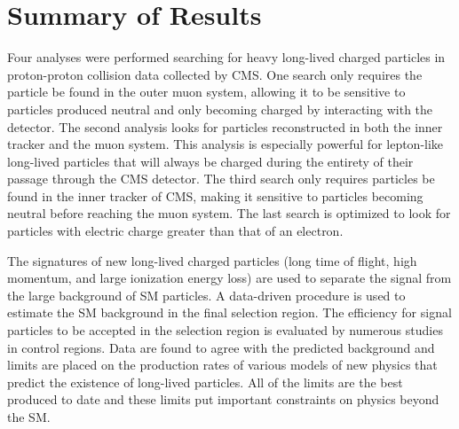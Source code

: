 





\section{Summary of Results}
Four analyses were performed searching for heavy long-lived charged particles in proton-proton collision data collected by CMS. One search only requires the particle be found
in the outer muon system, allowing it to be sensitive to particles produced neutral and only becoming charged by interacting with the detector. The second analysis looks
for particles reconstructed in both the inner tracker and the muon system. This analysis is especially powerful for lepton-like long-lived particles that will always be charged
during the entirety of their passage through the CMS detector. The third search only requires particles be found in the inner tracker of CMS, making it sensitive
to particles becoming neutral before reaching the muon system. The last search is optimized to look for particles with electric charge greater than that of
an electron.

The signatures of new long-lived charged particles (long time of flight, high momentum, and large ionization
energy loss) are used to separate the signal from the large background of SM particles.
A data-driven procedure is used to estimate the SM background in the final selection region. 
The efficiency for signal particles to be accepted in the selection region is evaluated by numerous studies in control regions.
Data are found to agree with the predicted background and limits are placed on the production rates of various models of new physics that predict
the existence of long-lived particles. All of the limits are the best produced to date and these limits put important constraints on physics beyond the SM.